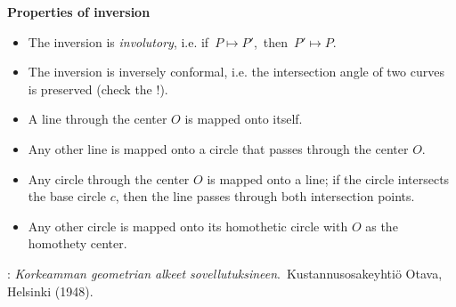 \documentclass[12pt]{article}
\theoremstyle{definition}
\begin{document}
\textbf{Properties of inversion}
\begin{itemize}
\item The inversion is {\em involutory}, i.e. if\, $P\mapsto P'$,\, then\, $P'\mapsto P$.
\item The inversion is inversely conformal, i.e. the intersection angle of two curves is preserved (check the !).
\item A line through the center $O$ is mapped onto itself.
\item Any other line is mapped onto a circle that passes through the center $O$.
\item Any circle through the center $O$ is mapped onto a line; if the circle intersects the base circle $c$, then the line passes through both intersection points.
\item Any other circle is mapped onto its homothetic circle with $O$ as the homothety center.
\end{itemize}

\begin{thebibliography}{9}
: {\em Korkeamman geometrian alkeet sovellutuksineen}.\, Kustannusosakeyhti\"o Otava, Helsinki (1948).
\end{thebibliography}

\end{document}
